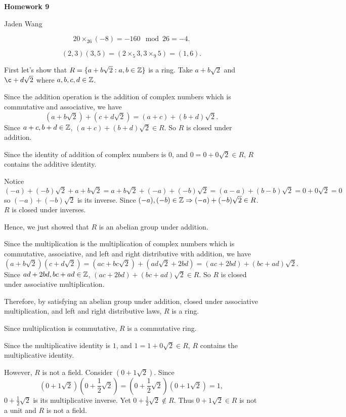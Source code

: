 \documentclass[12pt]{article}
\begin{document}
\centerline {\textsf{\textbf{\LARGE{Homework 9}}}}
\centerline {Jaden Wang}
\vspace{.15in}
\begin{problem}[18.4]
\[
	20 \times_{26} (-8) = -160 \mod 26 = -4
.\] 
\end{problem}

\begin{problem}[18.5]
\[
	(2,3)(3,5)= (2 \times_5 3, 3 \times_9 5) = (1,6)
.\] 
\end{problem}
\begin{problem}[18.11]
First let's show that $ R = \{a+b \sqrt{2}:a , b \in \mathbb{Z} \} $ is a ring. Take $ a+b\sqrt{2} $ and $ \c+d \sqrt{2} $ where $ a,b,c,d \in \mathbb{Z}$.

Since the addition operation is the addition of complex numbers which is commutative and associative, we have
\[
	(a+b\sqrt{2} ) + (c+ d \sqrt{2} ) = (a+c) + (b+d) \sqrt{2} 
.\] 
Since $ a+c, b+d \in \mathbb{Z}$, $ (a+c)+(b+d) \sqrt{2} \in R $. So $ R$ is closed under addition.

Since the identity of addition of complex numbers is 0, and $ 0= 0+0 \sqrt{2} \in R $, $ R$ contains the additive identity.

Notice
\[
	(-a)+(-b) \sqrt{2} + a+b \sqrt{2} = a+b \sqrt{2} + (-a) + (-b)\sqrt{2} = (a-a) + (b-b) \sqrt{2} = 0 + 0 \sqrt{2} = 0 
\]
so $ (-a)+(-b)\sqrt{2} $ is its inverse. Since $(-a),(-b) \in \mathbb{Z} \Rightarrow (-a)+(-b) \sqrt{2}  \in R$. $ R$ is closed under inverses.

Hence, we just showed that $ R$ is an abelian group under addition.

Since the multiplication is the multiplication of complex numbers which is commutative, associative, and left and right distributive with addition, we have
 \[
	 (a+b\sqrt{2} )(c+d\sqrt{2} )=(ac+bc\sqrt{2}) + (ad\sqrt{2} + 2bd)=(ac+2bd)+(bc+ad)\sqrt{2}  
.\] 
Since $ ad+2bd, bc+ad \in \mathbb{Z}$, $ (ac+2bd)+(bc+ad)\sqrt{2} \in R $. So $ R$ is closed under associative multiplication.

Therefore, by satisfying an abelian group under addition, closed under associative multiplication, and left and right distributive laws, $ R$ is a ring.

Since multiplication is commutative, $ R$ is a commutative ring.

Since the multiplicative identity is  $ 1$, and  $ 1 = 1 + 0\sqrt{2} \in R $, $ R$ contains the multiplicative identity.

However,  $ R$ is not a field. Consider  $ (0+1 \sqrt{2} )$. Since
\[
	(0+1\sqrt{2} )(0+\frac{1}{2}\sqrt{2} )=(0+\frac{1}{2}\sqrt{2} )(0+1\sqrt{2} ) = 1
,\] 
$ 0+\frac{1}{2}\sqrt{2} $ is its multiplicative inverse. Yet $ 0+\frac{1}{2}\sqrt{2} \not\in R $. Thus $ 0+1\sqrt{2} \in R$ is not a unit and $ R$ is not a field.
\end{problem}
\end{document}
